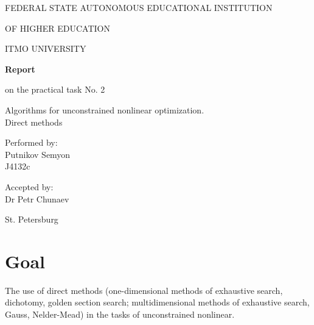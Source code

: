 \documentclass[a4paper,article,14pt]{extarticle}
\begin{document}
	\begin{titlepage}
		\begin{center}
			FEDERAL STATE AUTONOMOUS EDUCATIONAL INSTITUTION
			
			OF HIGHER EDUCATION
			
			ITMO UNIVERSITY
			\vspace{3cm}
			
			\large\textbf{Report}
			
			\large on the practical task No. 2
			
			\large \flqq Algorithms for unconstrained nonlinear optimization. \\ Direct methods\frqq
			\vspace{5cm}
			

			\begin{flushright}
				{Performed by:} \\
				Putnikov Semyon \\ 
				J4132c \\
			\end{flushright}
			
			
			\begin{flushright}
				{Accepted by:} \\
				Dr Petr Chunaev \\ 
			\end{flushright}
			\vfill
			
			{St. Petersburg}
			\par{\number\year}
		\end{center}
	\end{titlepage}

	\newpage
	
	\section{Goal}
	The use of direct methods (one-dimensional methods of exhaustive search, dichotomy, golden section search; multidimensional methods of exhaustive search, Gauss, Nelder-Mead) in the tasks of unconstrained nonlinear.
	
\end{document}
